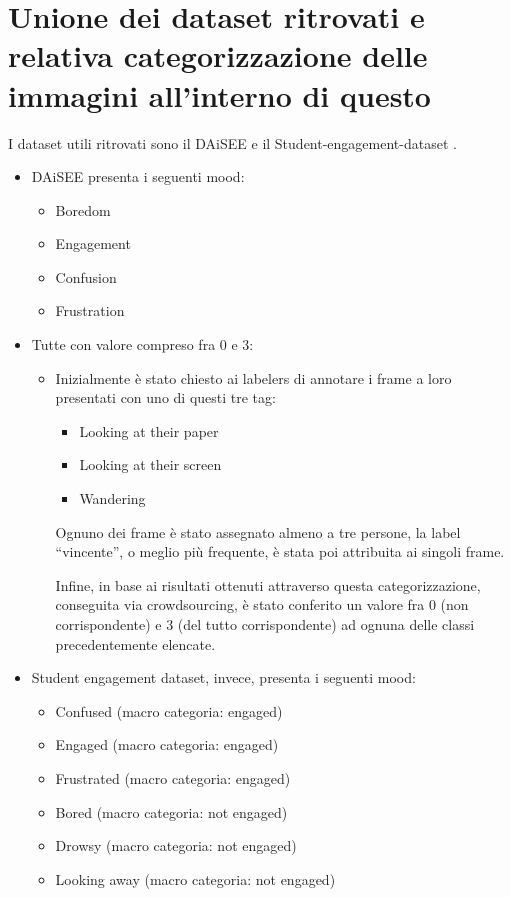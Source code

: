 \newpage

\section{Unione dei dataset ritrovati e relativa categorizzazione delle immagini all’interno di questo}

I dataset utili ritrovati sono il DAiSEE \cite{DAiSEE} e il Student-engagement-dataset \cite{StudEngagDataset}.

\begin{itemize}
    \item DAiSEE presenta i seguenti mood:
    \begin{itemize}
        \item Boredom
        \item Engagement
        \item Confusion
        \item Frustration
    \end{itemize}
    \item Tutte con valore compreso fra 0 e 3:
    \begin{itemize}
        \item Inizialmente è stato chiesto ai labelers di annotare i frame a loro presentati con uno di questi tre tag:
        \begin{itemize}
            \item Looking at their paper
            \item Looking at their screen
            \item Wandering
        \end{itemize}
            
        Ognuno dei frame è stato assegnato almeno a tre persone, la label “vincente”, o meglio più frequente, è stata poi attribuita ai singoli frame.

        Infine, in base ai risultati ottenuti attraverso questa categorizzazione, conseguita via crowdsourcing, è stato conferito un valore fra 0 (non corrispondente) e 3 (del tutto corrispondente) ad ognuna delle classi precedentemente elencate.
    \end{itemize}
    \item Student engagement dataset, invece, presenta i seguenti mood:
    \begin{itemize}
        \item Confused (macro categoria: engaged)
        \item Engaged (macro categoria: engaged)
        \item Frustrated (macro categoria: engaged)
        \item Bored (macro categoria: not engaged)
        \item Drowsy (macro categoria: not engaged)
        \item Looking away (macro categoria: not engaged)
    \end{itemize}
\end{itemize}

